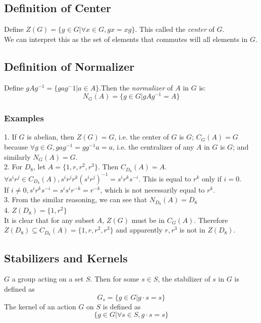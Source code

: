\documentclass{article}
\begin{document}
\subsection{Definition of Center}
\begin{addmargin}[1em]{0em}
Define $Z(G) = \{g \in G|\forall x \in G, gx = xg\}$. This called the \textit{center} of $G$.\\
We can interpret this as the set of elements that commutes will all elements in $G$.
\end{addmargin}
\subsection{Definition of Normalizer}
\begin{addmargin}[1em]{0em}
Define $gAg^{-1} = \{gag^-1|a\in A\}$.Then the \textit{normalizer} of $A$ in $G$ is:
\begin{equation*}
    N_G(A) = \{g\in G|gAg^{-1} = A\}
\end{equation*}
\end{addmargin}
\subsubsection{Examples}
\begin{addmargin}[1em]{0em}
1. If $G$ is abelian, then $Z(G) = G$, i.e. the center of $G$ is $G$; $C_G(A) = G$ because $\forall g \in G, gag^{-1} = gg^{-1}a = a$, i.e. the centralizer of any $A$ in $G$ is $G$; and similarly $N_G(A) = G$.\\
2. For $D_8$, let $A = \{1, r, r^2, r^3\}$. Then $C_{D_8}(A) = A$.\\
$\forall s^ir^j \in C_{D_8}(A), s^ir^jr^k(s^ir^j)^{-1} = s^ir^ks^{-i}$. This is equal to $r^k$ only if $i=0$.\\
If $i \neq 0, s^ir^ks^{-i} = s^is^ir^{-k} = r^{-k}$, which is not necessarily equal to $r^k$.\\
3. From the similar reasoning, we can see that $N_{D_8}(A) = D_8$\\
4. $Z(D_8) = \{1, r^2\}$\\
It is clear that for any subset $A$, $Z(G)$ must be in $C_G(A)$. Therefore $Z(D_8) \subseteq C_{D_8}(A) = \{1,r,r^2,r^3\}$ and apparently $r, r^3$ is not in $Z(D_8)$.
\end{addmargin}
\subsection{Stabilizers and Kernels}
$G$ a group acting on a set $S$. Then for some $s \in S$, the stabilizer of $s$ in $G$ is defined as
\begin{equation*}
    G_s = \{g \in G | g\cdot s = s\}
\end{equation*}
The kernel of an action $G$ on $S$ is defined as
\begin{equation*}
    \{g \in G | \forall s\in S, g\cdot s = s \}
\end{equation*}
\end{document}

